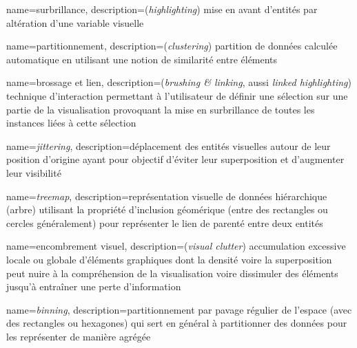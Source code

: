 

{
	name=surbrillance,
	description={(\emph{highlighting}) mise en avant d'entités par altération d'une variable visuelle}
}

{
        name=partitionnement,
        description={(\emph{clustering}) partition de données calculée automatique en utilisant une notion de similarité entre éléments}
}


{
        name=brossage et lien,
        description={(\emph{brushing \& linking}, aussi \emph{linked highlighting}) technique d'interaction permettant à l'utilisateur de définir une sélection sur une partie de la visualisation provoquant la mise en surbrillance de toutes les instances liées à cette sélection}
}
 
{
        name=\emph{jittering},
        description={déplacement des entités visuelles autour de leur position d'origine ayant pour objectif d'éviter leur superposition et d'augmenter leur visibilité}
}

{
	name=\emph{treemap},
	description={représentation visuelle de données hiérarchique (arbre) utilisant la propriété d'inclusion géomérique (entre des rectangles ou cercles généralement) pour représenter le lien de parenté entre deux entités }
}


{
        name=encombrement visuel,
        description={(\emph{visual clutter}) accumulation excessive locale ou globale  d'éléments graphiques dont la densité voire la superposition peut nuire à la compréhension de la visualisation  voire dissimuler des éléments jusqu'à entraîner une perte d'information  }
}

{
        name=\emph{binning},
        description={partitionnement par pavage régulier de l'espace (avec des rectangles ou hexagones)  qui sert en général à partitionner des données pour les représenter de manière agrégée }
}

